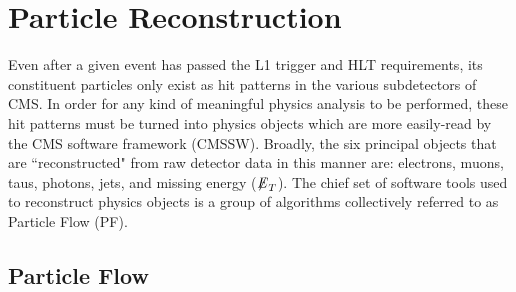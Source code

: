 \section{Particle Reconstruction}

Even after a given event has passed the L1 trigger and HLT requirements, its constituent particles only exist as hit patterns in the various subdetectors of CMS. In order for any kind of meaningful physics analysis to be performed, these hit patterns must be turned into physics objects which are more easily-read by the CMS software framework (CMSSW). Broadly, the six principal objects that are ``reconstructed" from raw detector data in this manner are: electrons, muons, taus, photons, jets, and missing energy (${\not\mathrel{E}}_T$). The chief set of software tools used to reconstruct physics objects is a group of algorithms collectively referred to as Particle Flow (PF).

\subsection{Particle Flow}

